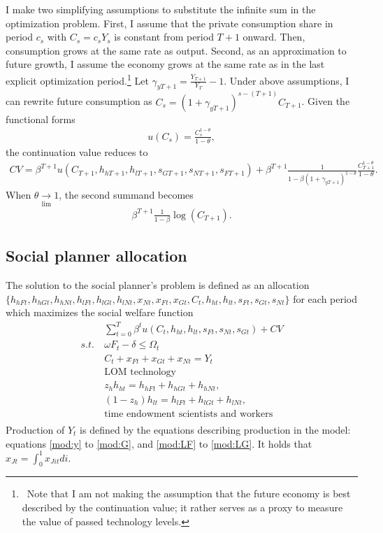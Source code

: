 I make two simplifying assumptions to substitute the infinite sum in the optimization problem. First, 
I assume that the private consumption share in period $c_s$ with $C_s=c_sY_s$ is constant from period $T+1$ onward.  Then, consumption grows at the same rate as output. 
Second, as an approximation to future growth, I assume the economy grows at the same rate as in the last explicit optimization period.\footnote{\ Note that I am not making the assumption that the future economy is best described by the continuation value; it rather serves as a proxy to measure the value of passed technology levels. } 
Let $\gamma_{yT+1}=\frac{Y_{T+1}}{Y_{T}}-1$. Under above assumptions, I can rewrite future consumption as $C_s=(1+\gamma_{yT+1})^{s-(T+1)}C_{T+1}$.
Given the functional forms
\begin{align*}
u(C_s)= \frac{C_s^{1-\theta}}{1-\theta},
\end{align*}
the continuation value reduces to
\begin{align*}
CV= \beta^{T+1} u(C_{T+1},h_{h{T+1}}, h_{l{T+1}}, s_{G{T+1}}, s_{N{T+1}}, s_{F{T+1}})+\beta^{T+1}\frac{1}{1-\beta (1+\gamma_{yT+1})^{1-\theta}}\frac{C_{T+1}^{1-\theta}}{1-\theta}.
\end{align*}
When $\theta\underset{\lim}{\rightarrow} 1$,  the second summand becomes
\begin{align*}\beta^{T+1}\frac{1}{1-\beta}\log(C_{T+1}).
\end{align*}
%

\subsection{Social planner allocation}\label{app:sp_prob} The solution to the social planner's problem is defined as an allocation \\ $\{h_{hFt}, h_{hGt}, h_{hNt}, h_{lFt}, h_{lGt}, h_{lNt}, x_{Nt}, x_{Ft}, x_{Gt}, C_t,  h_{ht}, h_{lt}, s_{Ft}, s_{Gt}, s_{Nt} \}$ for each period which maximizes the social welfare function 
\begin{align*} &\sum_{t=0}^{T}\beta^t u(C_{t}, h_{ht}, h_{lt}, s_{Ft}, s_{Nt}, s_{Gt})+ CV\\
s.t.\ &  \omega F_{t} -\delta \leq \Omega_t\\
&C_t+x_{Ft}+x_{Gt}+x_{Nt}=Y_t\\
&\text{LOM technology}\\
&z_h h_{ht}=h_{hFt}+h_{hGt}+h_{hNt},\\
&(1-z_h) h_{lt}=h_{lFt}+h_{lGt}+h_{lNt},\\
&\text{time endowment scientists and workers}\\
\end{align*}
Production of $Y_t$ is defined by the equations describing production in the model: equations \ref{mod:y} to \ref{mod:G}, and \ref{mod:LF} to \ref{mod:LG}. It holds that $x_{Jt}=\int_{0}^{1}x_{Jit}di$.
